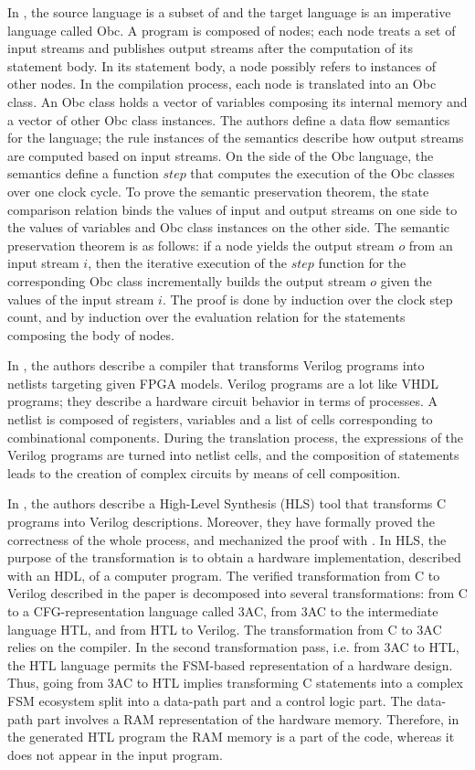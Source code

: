\documentclass[pdflatex,sn-mathphys]{sn-jnl}%
\theoremstyle{thmstyleone}%
\theoremstyle{thmstyletwo}%
\theoremstyle{thmstylethree}%
\begin{document}
In \cite{Bourke}, the source language is a subset of \lustre{} and the
target language is an imperative language called Obc. A \lustre{}
program is composed of nodes; each node treats a set of input streams
and publishes output streams after the computation of its statement
body. In its statement body, a \lustre{} node possibly refers to
instances of other nodes. In the compilation process, each \lustre{}
node is translated into an Obc class. An Obc class holds a vector of
variables composing its internal memory and a vector of other Obc
class instances. The authors define a data flow semantics for the
\lustre{} language; the rule instances of the semantics describe how
output streams are computed based on input streams.  On the side of
the Obc language, the semantics define a function $step$ that computes
the execution of the Obc classes over one clock cycle. To prove the
semantic preservation theorem, the state comparison relation binds the
values of input and output streams on one side to the values of
variables and Obc class instances on the other side. The semantic
preservation theorem is as follows: if a \lustre{} node yields the
output stream $o$ from an input stream $i$, then the iterative
execution of the $step$ function for the corresponding Obc class
incrementally builds the output stream $o$ given the values of the
input stream $i$. The proof is done by induction over the clock step
count, and by induction over the evaluation relation for the \lustre{}
statements composing the body of nodes.

In \cite{Loow2021}, the authors describe a compiler that transforms
Verilog programs into netlists targeting given FPGA models. Verilog
programs are a lot like VHDL programs; they describe a hardware
circuit behavior in terms of processes. A netlist is composed of
registers, variables and a list of cells corresponding to
combinational components. During the translation process, the
expressions of the Verilog programs are turned into netlist cells, and
the composition of statements leads to the creation of complex
circuits by means of cell composition.

In \cite{Herklotz2021}, the authors describe a High-Level Synthesis
(HLS) tool that transforms C programs into Verilog
descriptions. Moreover, they have formally proved the correctness of
the whole process, and mechanized the proof with \coq{}. In HLS, the
purpose of the transformation is to obtain a hardware implementation,
described with an HDL, of a computer program. The verified
transformation from C to Verilog described in the paper is decomposed
into several transformations: from C to a CFG-representation language
called 3AC, from 3AC to the intermediate language HTL, and from HTL to
Verilog. The transformation from C to 3AC relies on the \ccert{}
compiler. In the second transformation pass, i.e. from 3AC to HTL, the
HTL language permits the FSM-based representation of a hardware
design. Thus, going from 3AC to HTL implies transforming C statements
into a complex FSM ecosystem split into a data-path part and a control
logic part. The data-path part involves a RAM representation of the
hardware memory. Therefore, in the generated HTL program the RAM
memory is a part of the code, whereas it does not appear in the input
program.
\end{document}
